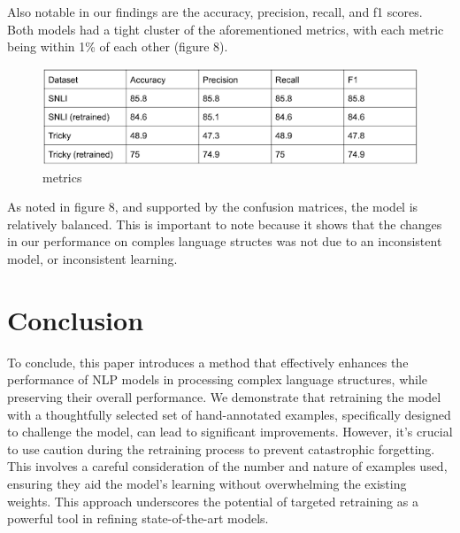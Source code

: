 \documentclass{article}
\begin{document}
\newpage
Also notable in our findings are the accuracy, precision, recall, and f1 scores. Both models had a tight cluster of the aforementioned metrics, with each metric being 
within 1\% of each other (figure 8). 

\begin{figure}[!h]
  \centering
  \includegraphics[width=\linewidth]{images/metrics_nlp_final_project.png}
  \caption{metrics}
  \label{fig:h}
\end{figure}

As noted in figure 8, and supported by the confusion matrices, the model is relatively balanced. This is important to note because it shows that the changes in our performance 
on comples language structes was not due to an inconsistent model, or inconsistent learning. 

\section{Conclusion}

To conclude, this paper introduces a method that effectively enhances the performance of NLP models in processing complex language structures, while  
preserving their overall performance. We demonstrate that retraining the model with a thoughtfully selected set of hand-annotated examples, specifically designed to challenge 
the model, can lead to significant improvements. However, it's crucial to use caution during the retraining process to prevent catastrophic forgetting. This involves a careful 
consideration of the number and nature of examples used, ensuring they aid the model's learning without overwhelming the existing weights. This approach underscores 
the potential of targeted retraining as a powerful tool in refining state-of-the-art models.
\end{document}
